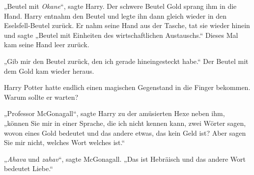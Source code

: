 
„Beutel mit \emph{Okane}“, sagte Harry. Der schwere Beutel Gold sprang ihm in die Hand. Harry entnahm den Beutel und legte ihn dann gleich wieder in den Eselsfell-Beutel zurück. Er nahm seine Hand aus der Tasche, tat sie wieder hinein und sagte „Beutel mit Einheiten des wirtschaftlichen Austauschs.“ Dieses Mal kam seine Hand leer zurück.

„Gib mir den Beutel zurück, den ich gerade hineingesteckt habe.“ Der Beutel mit dem Gold kam wieder heraus.

Harry Potter hatte endlich einen magischen Gegenstand in die Finger bekommen. Warum sollte er warten?

„Professor McGonagall“, sagte Harry zu der amüsierten Hexe neben ihm, „können Sie mir in einer Sprache, die ich nicht kennen kann, zwei Wörter sagen, wovon eines Gold bedeutet und das andere etwas, das kein Geld ist? Aber sagen Sie mir nicht, welches Wort welches ist.“

„\emph{Ahava} und \emph{zahav}“, sagte McGonagall. „Das ist Hebräisch und das andere Wort bedeutet Liebe.“

